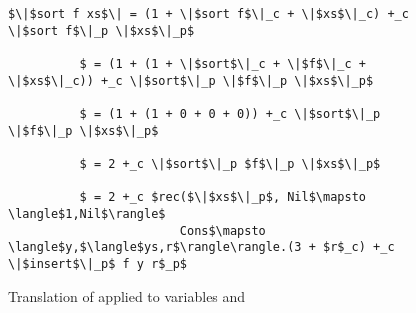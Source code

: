 %
\begin{figure}[H]
  \caption{Translation of  applied to variables  and }
\label{fig:sort_applied}
\begin{lstlisting}
$\|$sort f xs$\| = (1 + \|$sort f$\|_c + \|$xs$\|_c) +_c \|$sort f$\|_p \|$xs$\|_p$

          $ = (1 + (1 + \|$sort$\|_c + \|$f$\|_c + \|$xs$\|_c)) +_c \|$sort$\|_p \|$f$\|_p \|$xs$\|_p$

          $ = (1 + (1 + 0 + 0 + 0)) +_c \|$sort$\|_p \|$f$\|_p \|$xs$\|_p$

          $ = 2 +_c \|$sort$\|_p $f$\|_p \|$xs$\|_p$

          $ = 2 +_c $rec($\|$xs$\|_p$, Nil$\mapsto \langle$1,Nil$\rangle$
                        Cons$\mapsto \langle$y,$\langle$ys,r$\rangle\rangle.(3 + $r$_c) +_c \|$insert$\|_p$ f y r$_p$
\end{lstlisting}
\end{figure}
%
%
